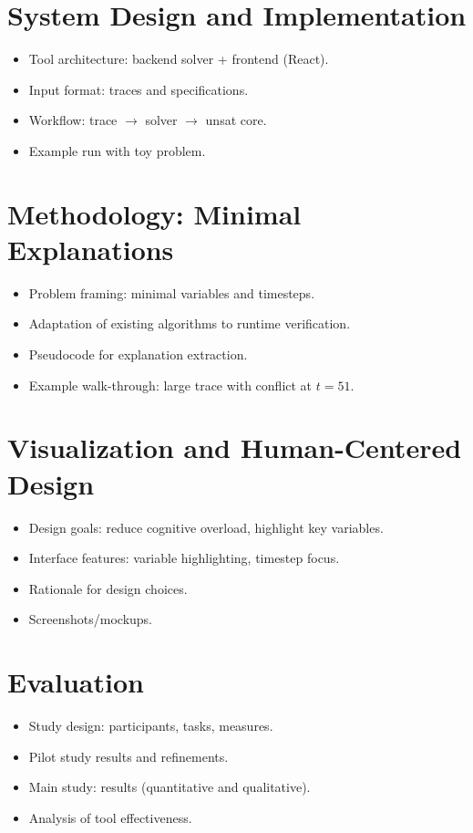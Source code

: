 \documentclass[12pt]{report}
\begin{document}
\chapter{System Design and Implementation}
\begin{itemize}
  \item Tool architecture: backend solver + frontend (React).
  \item Input format: traces and specifications.
  \item Workflow: trace $\rightarrow$ solver $\rightarrow$ unsat core.
  \item Example run with toy problem.
\end{itemize}

\chapter{Methodology: Minimal Explanations}
\begin{itemize}
  \item Problem framing: minimal variables and timesteps.
  \item Adaptation of existing algorithms to runtime verification.
  \item Pseudocode for explanation extraction.
  \item Example walk-through: large trace with conflict at $t=51$.
\end{itemize}

\chapter{Visualization and Human-Centered Design}
\begin{itemize}
  \item Design goals: reduce cognitive overload, highlight key variables.
  \item Interface features: variable highlighting, timestep focus.
  \item Rationale for design choices.
  \item Screenshots/mockups.
\end{itemize}

\chapter{Evaluation}
\begin{itemize}
  \item Study design: participants, tasks, measures.
  \item Pilot study results and refinements.
  \item Main study: results (quantitative and qualitative).
  \item Analysis of tool effectiveness.
\end{itemize}
\end{document}
